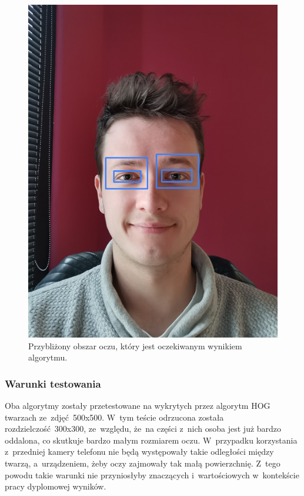 \begin{figure}[!h]
    \begin{center}
        \includegraphics[scale=0.6]{img/eye_section/expected_eyes_region.png}
        \caption{Przybliżony obszar oczu, który jest oczekiwanym wynikiem algorytmu.}
        \label{fig:expected_eyes_region}
    \end{center}
\end{figure}

\subsubsection{Warunki testowania}

Oba algorytmy zostały przetestowane na wykrytych przez algorytm HOG twarzach ze~zdjęć~500x500. W~tym teście odrzucona została rozdzielczość~300x300, ze~względu, że~na części z~nich osoba jest już bardzo oddalona, co skutkuje bardzo małym rozmiarem oczu. W~przypadku korzystania z~przedniej kamery telefonu nie będą występowały takie odległości między twarzą, a~urządzeniem, żeby oczy zajmowały tak małą powierzchnię. Z~tego powodu takie warunki nie przyniosłyby znaczących i~wartościowych w~kontekście pracy dyplomowej wyników. 

